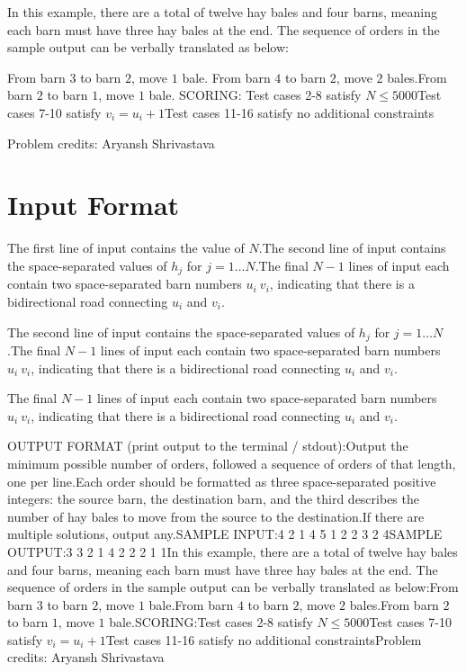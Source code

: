\documentclass[12pt]{article}
\begin{document}
In this example, there are a total of twelve hay bales and four barns, meaning
each barn must have three hay bales at the end. The sequence of orders in the
sample output can be verbally translated as below:

From barn $3$ to barn $2$, move $1$ bale. From barn $4$ to barn $2$, move $2$ bales.From barn $2$ to barn $1$, move $1$ bale. 
SCORING:
Test cases 2-8 satisfy $N\leq 5000$Test cases 7-10 satisfy $v_i=u_i+1$Test cases 11-16 satisfy no additional constraints


Problem credits: Aryansh Shrivastava



\section*{Input Format}
The first line of input contains the value of $N.$The second line of input contains the space-separated values of $h_j$ for
$j = 1 \dots N$.The final $N-1$ lines of input each contain two space-separated barn numbers
$u_i \ v_i$, indicating that there is a bidirectional road connecting $u_i$ and
$v_i$.

The second line of input contains the space-separated values of $h_j$ for
$j = 1 \dots N$.The final $N-1$ lines of input each contain two space-separated barn numbers
$u_i \ v_i$, indicating that there is a bidirectional road connecting $u_i$ and
$v_i$.

The final $N-1$ lines of input each contain two space-separated barn numbers
$u_i \ v_i$, indicating that there is a bidirectional road connecting $u_i$ and
$v_i$.

OUTPUT FORMAT (print output to the terminal / stdout):Output the minimum possible number of orders, followed a sequence of orders of
that length, one per line.Each order should be formatted as three space-separated positive integers: the
source barn, the destination barn, and the third describes the number of hay
bales to move from the source to the destination.If there are multiple solutions, output any.SAMPLE INPUT:4
2 1 4 5
1 2
2 3
2 4SAMPLE OUTPUT:3
3 2 1
4 2 2
2 1 1In this example, there are a total of twelve hay bales and four barns, meaning
each barn must have three hay bales at the end. The sequence of orders in the
sample output can be verbally translated as below:From barn $3$ to barn $2$, move $1$ bale.From barn $4$ to barn $2$, move $2$ bales.From barn $2$ to barn $1$, move $1$ bale.SCORING:Test cases 2-8 satisfy $N\leq 5000$Test cases 7-10 satisfy $v_i=u_i+1$Test cases 11-16 satisfy no additional constraintsProblem credits: Aryansh Shrivastava
\end{document}

